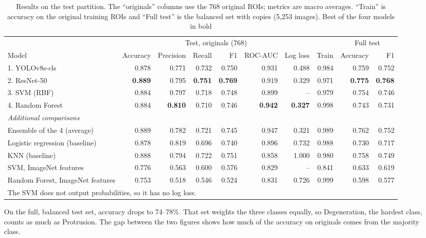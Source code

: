 \begin{table}[t]
\centering\footnotesize
\setlength{\tabcolsep}{4.5pt}
\caption{Results on the test partition. The ``originals'' columns use the 768 original ROIs; metrics are macro averages. ``Train'' is accuracy on the original training ROIs and ``Full test'' is the balanced set with copies (5,253 images). Best of the four models in bold}
\label{tab:results}
\begin{tabular}{lrrrrrrrrr}
\toprule
 & \multicolumn{6}{c}{Test, originals (768)} & & \multicolumn{2}{c}{Full test} \\
\cmidrule(lr){2-7}\cmidrule(lr){9-10}
Model & Accuracy & Precision & Recall & F1 & ROC-AUC & Log loss & Train & Accuracy & F1 \\
\midrule
1. YOLOv8s-cls        & 0.878 & 0.771 & 0.732 & 0.750 & 0.931 & 0.488 & 0.984 & 0.759 & 0.752 \\
2. ResNet-50          & \textbf{0.889} & 0.795 & \textbf{0.751} & \textbf{0.769} & 0.919 & 0.329 & 0.971 & \textbf{0.775} & \textbf{0.768} \\
3. SVM (RBF)          & 0.884 & 0.797 & 0.718 & 0.748 & 0.899 & -- & 0.979 & 0.754 & 0.746 \\
4. Random Forest      & 0.884 & \textbf{0.810} & 0.710 & 0.746 & \textbf{0.942} & \textbf{0.327} & 0.998 & 0.743 & 0.731 \\
\midrule
\multicolumn{10}{l}{\emph{Additional comparisons}} \\
Ensemble of the 4 (average)          & 0.889 & 0.782 & 0.721 & 0.745 & 0.947 & 0.321 & 0.989 & 0.762 & 0.752 \\
Logistic regression (baseline)       & 0.878 & 0.819 & 0.696 & 0.740 & 0.896 & 0.732 & 0.988 & 0.730 & 0.717 \\
KNN (baseline)                       & 0.888 & 0.794 & 0.722 & 0.751 & 0.858 & 1.000 & 0.980 & 0.758 & 0.749 \\
SVM, ImageNet features               & 0.776 & 0.563 & 0.600 & 0.576 & 0.829 & -- & 0.841 & 0.633 & 0.619 \\
Random Forest, ImageNet features     & 0.753 & 0.518 & 0.546 & 0.524 & 0.831 & 0.726 & 0.999 & 0.598 & 0.577 \\
\bottomrule
\multicolumn{10}{l}{\scriptsize The SVM does not output probabilities, so it has no log loss.}
\end{tabular}
\end{table}

On the full, balanced test set, accuracy drops to 74--78\%. That set weights the three classes equally, so Degeneration, the hardest class, counts as much as Protrusion. The gap between the two figures shows how much of the accuracy on originals comes from the majority class.

